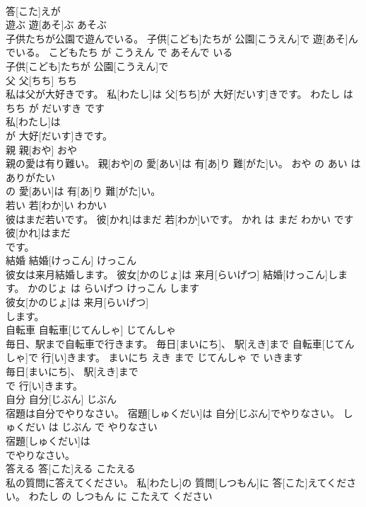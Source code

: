 \documentclass[8pt]{extreport}
\begin{document}
\begin{CJK}{UTF8}{min}
\\	答[こた]えが
\\	遊ぶ	遊[あそ]ぶ	あそぶ	
\\	子供たちが公園で遊んでいる。	子供[こども]たちが 公園[こうえん]で 遊[あそ]んでいる。	こどもたち が こうえん で あそんで いる	
\\	子供[こども]たちが 公園[こうえん]で
\\	父	父[ちち]	ちち	
\\	私は父が大好きです。	私[わたし]は 父[ちち]が 大好[だいす]きです。	わたし は ちち が だいすき です	
\\	私[わたし]は
\\	が 大好[だいす]きです。			
\\	親	親[おや]	おや	
\\	親の愛は有り難い。	親[おや]の 愛[あい]は 有[あ]り 難[がた]い。	おや の あい は ありがたい	
\\	の 愛[あい]は 有[あ]り 難[がた]い。			
\\	若い	若[わか]い	わかい	
\\	彼はまだ若いです。	彼[かれ]はまだ 若[わか]いです。	かれ は まだ わかい です	
\\	彼[かれ]はまだ
\\	です。			
\\	結婚	結婚[けっこん]	けっこん	
\\	彼女は来月結婚します。	彼女[かのじょ]は 来月[らいげつ] 結婚[けっこん]します。	かのじょ は らいげつ けっこん します	
\\	彼女[かのじょ]は 来月[らいげつ]
\\	します。			
\\	自転車	自転車[じてんしゃ]	じてんしゃ	
\\	毎日、駅まで自転車で行きます。	毎日[まいにち]、 駅[えき]まで 自転車[じてんしゃ]で 行[い]きます。	まいにち えき まで じてんしゃ で いきます	
\\	毎日[まいにち]、 駅[えき]まで
\\	で 行[い]きます。			
\\	自分	自分[じぶん]	じぶん	
\\	宿題は自分でやりなさい。	宿題[しゅくだい]は 自分[じぶん]でやりなさい。	しゅくだい は じぶん で やりなさい	
\\	宿題[しゅくだい]は
\\	でやりなさい。			
\\	答える	答[こた]える	こたえる	
\\	私の質問に答えてください。	私[わたし]の 質問[しつもん]に 答[こた]えてください。	わたし の しつもん に こたえて ください	

\end{CJK}
\end{document}
